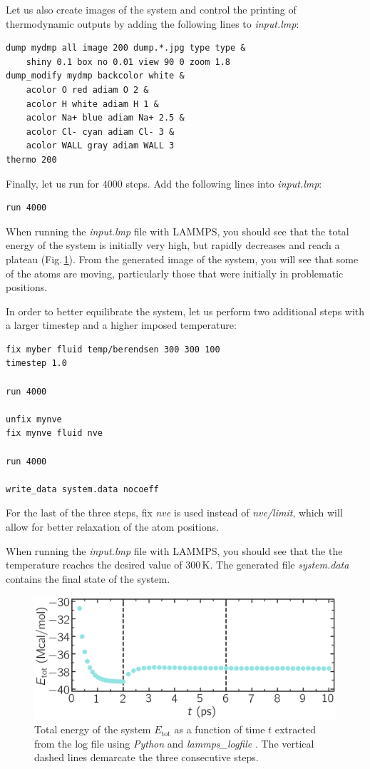 \documentclass[9pt,tutorial]{livecoms}
\begin{document}
Let us also create images of the system and control
the printing of thermodynamic outputs by adding the following lines to \textit{input.lmp}:
{\normalsize \begin{verbatim}
dump mydmp all image 200 dump.*.jpg type type &
    shiny 0.1 box no 0.01 view 90 0 zoom 1.8
dump_modify mydmp backcolor white &
    acolor O red adiam O 2 &
    acolor H white adiam H 1 &
    acolor Na+ blue adiam Na+ 2.5 &
    acolor Cl- cyan adiam Cl- 3 &
    acolor WALL gray adiam WALL 3
thermo 200
\end{verbatim}}
Finally, let us run for 4000 steps. Add the following lines into \textit{input.lmp}:
{\normalsize \begin{verbatim}
run 4000
\end{verbatim}}
When running the \textit{input.lmp} file with LAMMPS, you should see that the
total energy of the system is initially very high, but rapidly decreases and
reach a plateau (Fig.\,\ref{fig:NANOSHEAR-minimization}). From the generated image of the system,
you will see that some of the atoms are moving, particularly those that were
initially in problematic positions.

In order to better equilibrate the system, let us perform two additional steps
with a larger timestep and a higher imposed temperature:
{\normalsize \begin{verbatim}
fix myber fluid temp/berendsen 300 300 100
timestep 1.0

run 4000

unfix mynve
fix mynve fluid nve

run 4000

write_data system.data nocoeff
\end{verbatim}}
For the last of the three steps, fix \textit{nve} is used instead of
\textit{nve/limit}, which will allow for better relaxation of the atom positions.

When running the \textit{input.lmp} file with LAMMPS, you should see that the
the temperature reaches the desired value of $300\,\text{K}$. The generated file
\textit{system.data} contains the final state of the system.

\begin{figure}
\centering
\includegraphics[width=\linewidth]{NANOSHEAR-minimization}
\caption{Total energy of the system $E_\text{tot}$ as a function of time $t$
extracted from the log file using \textit{Python} and \textit{lammps\_logfile}
\cite{sveinsson2021logfile}. The vertical dashed lines demarcate the three
consecutive steps.}
\label{fig:NANOSHEAR-minimization}
\end{figure}
\end{document}
